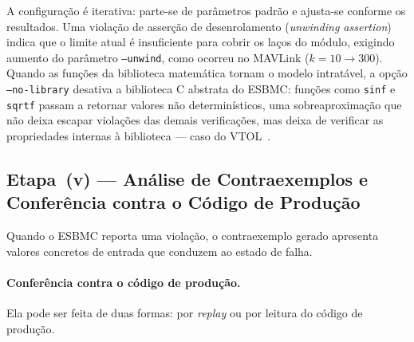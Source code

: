 A configuração é iterativa: parte-se de parâmetros padrão e ajusta-se conforme
os resultados. Uma violação de asserção de desenrolamento (\textit{unwinding
assertion}) indica que o limite atual é insuficiente para cobrir os laços do
módulo, exigindo aumento do parâmetro \texttt{--unwind}, como ocorreu
no MAVLink ($k = 10 \rightarrow 300$). Quando as funções da biblioteca matemática
tornam o modelo intratável, a opção \texttt{--no-library} desativa a biblioteca C
abstrata do ESBMC: funções como \texttt{sinf} e \texttt{sqrtf} passam a
retornar valores não determinísticos, uma sobreaproximação que não deixa escapar
violações das demais verificações, mas deixa de verificar as propriedades
internas à biblioteca --- caso do VTOL~\cite{Menezes2024}.

\subsection{Etapa~(v) --- Análise de Contraexemplos e Conferência contra o Código de Produção}

Quando o ESBMC reporta uma violação, o contraexemplo gerado
apresenta valores concretos de entrada que conduzem ao estado de falha.


\paragraph{Conferência contra o código de produção.}
\label{subsec:etapa-replay}

Ela pode ser feita de duas formas: por \textit{replay} ou por leitura do
código de produção.

